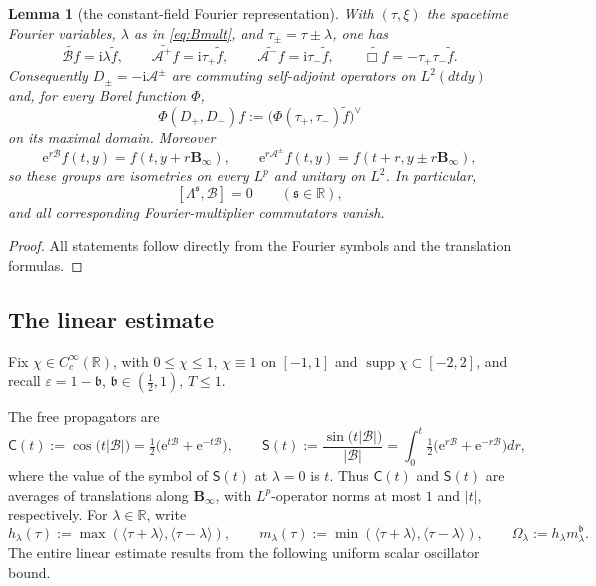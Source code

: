 \documentclass[11pt,reqno]{amsart}
\theoremstyle{plain}
\newtheorem{lemma}[theorem]{Lemma}
\theoremstyle{definition}
\theoremstyle{remark}
\numberwithin{equation}{section}
\DeclareMathOperator{\supp}{supp}
\newcommand{\breg}{\mathfrak b}
\newcommand{\sreg}{\mathfrak s}
\newcommand{\Binf}{\mathbf B_\infty}
\newcommand{\Cprop}{\mathsf C}
\newcommand{\Sprop}{\mathsf S}
\newcommand{\Real}{\mathbb R}
\begin{document}
\begin{lemma}[the constant-field Fourier representation]\label{lem:alfven-action}
With $(\tau,\xi)$ the spacetime Fourier variables, $\lambda$ as in
\eqref{eq:Bmult}, and $\tau_\pm=\tau\pm\lambda$, one has
\begin{equation}\label{eq:joint-res}
 \widetilde{\mathcal Bf}=\mathrm i\lambda\widetilde f,
 \qquad
 \widetilde{\mathcal A^+f}=\mathrm i\tau_+\widetilde f,
 \qquad
 \widetilde{\mathcal A^-f}=\mathrm i\tau_-\widetilde f,
 \qquad
 \widetilde{\Box f}=-\tau_+\tau_-\widetilde f .
\end{equation}
Consequently $D_\pm=-\mathrm i\mathcal A^\pm$ are commuting self-adjoint
operators on $L^2(dt dy)$ and, for every Borel function $\Phi$,
\begin{equation}\label{eq:calculus}
 \Phi(D_+,D_-)f
 :=\big(\Phi(\tau_+,\tau_-)\widetilde f\big)^\vee
\end{equation}
on its maximal domain.  Moreover
\[
 \mathrm e^{r\mathcal B}f(t,y)=f(t,y+r\Binf),
 \qquad
 \mathrm e^{r\mathcal A^\pm}f(t,y)=f(t+r,y\pm r\Binf),
\]
so these groups are isometries on every $L^p$ and unitary on $L^2$.  In particular,
\begin{equation}\label{eq:comm-zero}
 [\Lambda^{\sreg},\mathcal B]=0
 \qquad(\sreg\in\Real),
\end{equation}
and all corresponding Fourier-multiplier commutators vanish.
\end{lemma}

\begin{proof}
All statements follow directly from the Fourier symbols and the translation formulas.
\end{proof}

\subsection{The linear estimate}
\label{ssec:linear}

Fix $\chi\in C^\infty_c(\Real)$, with $0\le\chi\le1$, $\chi\equiv1$ on
$[-1,1]$ and $\supp\chi\subset[-2,2]$, and recall
$\varepsilon=1-\breg$, $\breg\in(\frac12,1)$, $T\leq 1$.  

The free propagators are
\begin{equation}\label{eq:propagator}
\Cprop(t):=\cos\big(t|\mathcal B|\big)
=\tfrac12\big(\mathrm e^{t\mathcal B}+\mathrm e^{-t\mathcal B}\big),
\qquad
\Sprop(t):=\frac{\sin\big(t|\mathcal B|\big)}{|\mathcal B|}
=\int_0^{t}\tfrac12\big(\mathrm e^{r\mathcal B}+\mathrm e^{-r\mathcal B}\big) dr ,
\end{equation}
where the value of the symbol of $\Sprop(t)$ at $\lambda=0$ is $t$.  Thus $\Cprop(t)$ and
$\Sprop(t)$ are averages of translations along $\Binf$, with
$L^p$-operator norms at most $1$ and $|t|$, respectively. For
$\lambda\in\Real$, write
\[
 h_\lambda(\tau):=\max(\langle\tau+\lambda\rangle,\langle\tau-\lambda\rangle),
 \qquad
 m_\lambda(\tau):=\min(\langle\tau+\lambda\rangle,\langle\tau-\lambda\rangle),
 \qquad
 \Omega_\lambda:=h_\lambda m_\lambda^{\breg}.
\]
The entire linear estimate results from the following uniform scalar oscillator bound.
\end{document}

